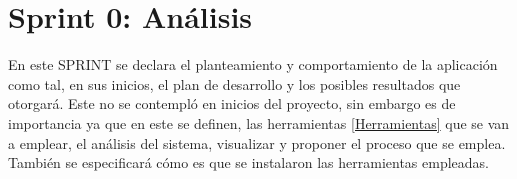 %	
%	
%	
%	
%	
%	

	\section{Sprint 0: Análisis}
	\noindent En este SPRINT se declara el planteamiento y comportamiento de la aplicación como tal, en sus inicios, el plan de desarrollo y los posibles resultados que otorgará.
	Este no se contempló en inicios del proyecto, sin embargo es de importancia ya que en este se definen, las herramientas \ref{Herramientas} que se van a emplear, el análisis del sistema, visualizar y proponer el proceso que se emplea.
	También se especificará cómo es que se instalaron las herramientas empleadas.
	
